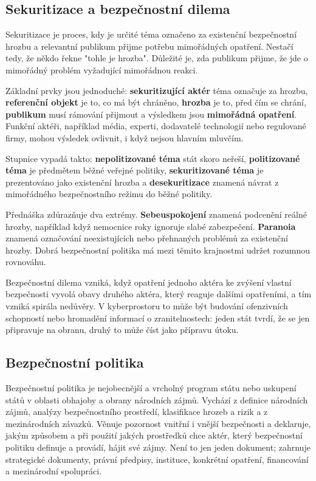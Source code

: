 \documentclass[11pt,a4paper]{article}
\begin{document}
\subsection*{Sekuritizace a bezpečnostní dilema}
Sekuritizace je proces, kdy je určité téma označeno za existenční bezpečnostní hrozbu a relevantní publikum přijme potřebu mimořádných opatření. Nestačí tedy, že někdo řekne "tohle je hrozba". Důležité je, zda publikum přijme, že jde o mimořádný problém vyžadující mimořádnou reakci.

Základní prvky jsou jednoduché: \textbf{sekuritizující aktér} téma označuje za hrozbu, \textbf{referenční objekt} je to, co má být chráněno, \textbf{hrozba} je to, před čím se chrání, \textbf{publikum} musí rámování přijmout a výsledkem jsou \textbf{mimořádná opatření}. Funkční aktéři, například média, experti, dodavatelé technologií nebo regulované firmy, mohou výsledek ovlivnit, i když nejsou hlavním mluvčím.

Stupnice vypadá takto: \textbf{nepolitizované téma} stát skoro neřeší, \textbf{politizované téma} je předmětem běžné veřejné politiky, \textbf{sekuritizované téma} je prezentováno jako existenční hrozba a \textbf{desekuritizace} znamená návrat z mimořádného bezpečnostního režimu do běžné politiky.

Přednáška zdůrazňuje dva extrémy. \textbf{Sebeuspokojení} znamená podcenění reálné hrozby, například když nemocnice roky ignoruje slabé zabezpečení. \textbf{Paranoia} znamená označování neexistujících nebo přehnaných problémů za existenční hrozby. Dobrá bezpečnostní politika má mezi těmito krajnostmi udržet rozumnou rovnováhu.

Bezpečnostní dilema vzniká, když opatření jednoho aktéra ke zvýšení vlastní bezpečnosti vyvolá obavy druhého aktéra, který reaguje dalšími opatřeními, a tím vzniká spirála nedůvěry. V kyberprostoru to může být budování ofenzivních schopností nebo hromadění informací o zranitelnostech: jeden stát tvrdí, že se jen připravuje na obranu, druhý to může číst jako přípravu útoku.

\subsection*{Bezpečnostní politika}
Bezpečnostní politika je nejobecnější a vrcholný program státu nebo uskupení států v oblasti obhajoby a obrany národních zájmů. Vychází z definice národních zájmů, analýzy bezpečnostního prostředí, klasifikace hrozeb a rizik a z mezinárodních závazků. Věnuje pozornost vnitřní i vnější bezpečnosti a deklaruje, jakým způsobem a při použití jakých prostředků chce aktér, který bezpečnostní politiku definuje a provádí, hájit své zájmy. Není to jen jeden dokument; zahrnuje strategické dokumenty, právní předpisy, instituce, konkrétní opatření, financování a mezinárodní spolupráci.
\end{document}
